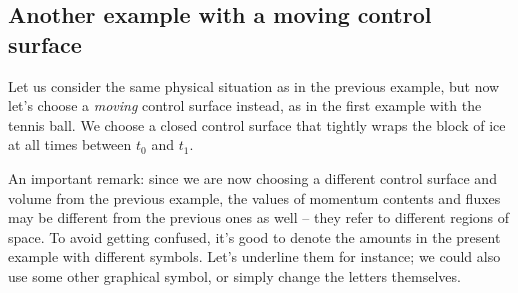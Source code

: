 \documentclass[a4paper,12pt,%
onecolumn,oneside,%
british%
]{memoir}
\renewcommand*{\|}[1][]{\nonscript\:#1\vert\nonscript\:\mathopen{}}
\newcommand*{\yti}{t_{0}}
\newcommand*{\ytf}{t_{1}}
\begin{document}
\subsection{Another example with a moving control surface}
\label{sec:ice_moving_surface}

Let us consider the same physical situation as in the previous example, but now let's choose a \emph{moving} control surface instead, as in the first example with the tennis ball. We choose a closed control surface that tightly wraps the block of ice at all times between $\yti$ and $\ytf$.

%
%
An important remark: since we are now choosing a different control surface and volume from the previous example, the values of momentum contents and fluxes may be different from the previous ones as well -- they refer to different regions of space. To avoid getting confused, it's good to denote the amounts in the present example with different symbols. Let's underline them for instance; we could also use some other graphical symbol, or simply change the letters themselves.
\end{document}
